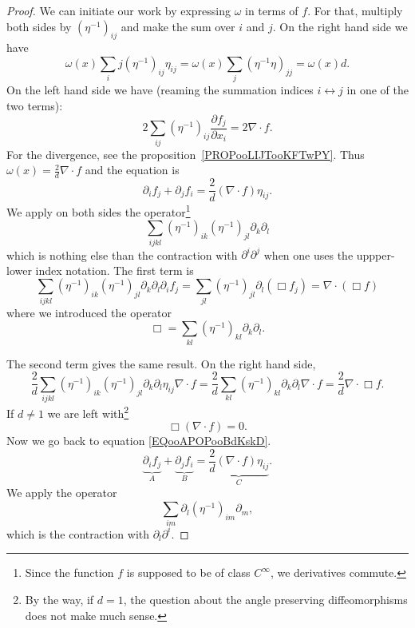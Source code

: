\begin{proof}
	We can initiate our work by expressing \( \omega\) in terms of \( f\). For that, multiply both sides by \( (\eta^{-1})_{ij}\) and make the sum over \( i\) and \( j\). On the right hand side we have
	\begin{equation}
		\omega(x)\sum_ij(\eta^{-1})_{ij}\eta_{ij}=\omega(x)\sum_j(\eta^{-1}\eta)_{jj}=\omega(x)d.
	\end{equation}
	On the left hand side we have (reaming the summation indices \( i\leftrightarrow j\) in one of the two terms):
	\begin{equation}
		2\sum_{ij}(\eta^{-1})_{ij}\frac{ \partial  f_j }{ \partial x_i }=2\nabla\cdot  f.
	\end{equation}
	For the divergence, see the proposition~\ref{PROPooLIJTooKFTwPY}. Thus \( \omega(x)=\frac{ 2 }{ d }\nabla\cdot f\) and the equation is
	\begin{equation}    \label{EQooAPOPooBdKskD}
		\partial_i f_j+\partial_j f_i=\frac{ 2 }{ d }(\nabla\cdot f)\eta_{ij}.
	\end{equation}
	We apply on both sides the operator\footnote{Since the function \( f\) is supposed to be of class \(  C^{\infty}\), we derivatives commute.}
	\begin{equation}
		\sum_{ijkl}(\eta^{-1})_{ik}(\eta^{-1})_{jl}\partial_k\partial_l
	\end{equation}
	which is nothing else than the contraction with \( \partial^i\partial^j\) when one uses the uppper-lower index notation.
	The first term is
	\begin{equation}
		\sum_{ijkl}(\eta^{-1})_{ik}(\eta^{-1})_{jl}\partial_k\partial_l\partial_i f_j=\sum_{jl}(\eta^{-1})_{jl}\partial_l(\Box  f_j)=\nabla\cdot(\Box f)
	\end{equation}
	where we introduced the operator
	\begin{equation}
		\Box=\sum_{kl}(\eta^{-1})_{kl}\partial_k\partial_l.
	\end{equation}

	The second term gives the same result. On the right hand side,
	\begin{equation}
		\frac{ 2 }{ d }\sum_{ijkl}(\eta^{-1})_{ik}(\eta^{-1})_{jl}\partial_k\partial_l\eta_{ij}\nabla\cdot  f=\frac{ 2 }{ d }\sum_{kl}(\eta^{-1})_{kl}\partial_k\partial_l\nabla\cdot f=\frac{ 2 }{ d }\nabla\cdot\Box f.
	\end{equation}
	If \( d\neq 1\) we are left with\footnote{By the way, if \( d=1\), the question about the angle preserving diffeomorphisms does not make much sense.}
	\begin{equation}
		\Box(\nabla\cdot  f)=0.
	\end{equation}
	Now we go back to equation \eqref{EQooAPOPooBdKskD}.
	\begin{equation}
		\underbrace{\partial_i f_j}_{A}+\underbrace{\partial_j f_i}_{B}=\underbrace{\frac{ 2 }{ d }(\nabla\cdot f)\eta_{ij}}_C.
	\end{equation}
	We apply the operator
	\begin{equation}
		\sum_{im}\partial_l(\eta^{-1})_{im}\partial_m,
	\end{equation}
	which is the contraction with \( \partial_l\partial^i\).


\end{proof}
